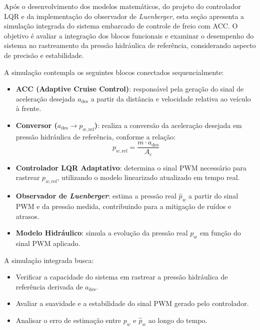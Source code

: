 \label{sec:controle-4-4}

Após o desenvolvimento dos modelos matemáticos, do projeto do controlador LQR e da implementação do observador de \textit{Luenberger}, esta seção apresenta a simulação integrada do sistema embarcado de controle de freio com ACC. O objetivo é avaliar a integração dos blocos funcionais e examinar o desempenho do sistema no rastreamento da pressão hidráulica de referência, considerando aspecto de precisão e estabilidade.

A simulação contempla os seguintes blocos conectados sequencialmente:

\begin{itemize} 
    \item \textbf{ACC (Adaptive Cruise Control)}: responsável pela geração do sinal de aceleração desejada \(a_{\text{des}}\) a partir da distância e velocidade relativa ao veículo à frente. 
    \item \textbf{Conversor (\(a_{\text{des}} \rightarrow p_{w,\text{ref}}\))}: realiza a conversão da aceleração desejada em pressão hidráulica de referência, conforme a relação: 
          \[ p_{w,\text{ref}} = \frac{m \cdot a_{\text{des}}}{A_c} \] 
    \item \textbf{Controlador LQR Adaptativo}: determina o sinal PWM necessário para rastrear \(p_{w,\text{ref}}\), utilizando o modelo linearizado atualizado em tempo real. 
    \item \textbf{Observador de \textit{Luenberger}}: estima a pressão real \(\hat{p}_w\) a partir do sinal PWM e da pressão medida, contribuindo para a mitigação de ruídos e atrasos. 
    \item \textbf{Modelo Hidráulico}: simula a evolução da pressão real \(p_w\) em função do sinal PWM aplicado. 
\end{itemize}

A simulação integrada busca:

\begin{itemize} 
    \item Verificar a capacidade do sistema em rastrear a pressão hidráulica de referência derivada de \(a_{\text{des}}\). 
    \item Avaliar a suavidade e a estabilidade do sinal PWM gerado pelo controlador. 
    \item Analisar o erro de estimação entre \(p_w\) e \(\hat{p}_w\) ao longo do tempo. 
\end{itemize}

